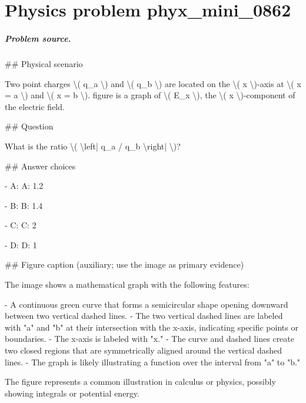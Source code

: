 
\chapter{Physics problem phyx\_mini\_0862}
\label{ch:PhyXMiniProblems_problem_phyx_mini_0862}

\paragraph{Problem source.}
\#\# Physical scenario

Two point charges \textbackslash{}( q\_a \textbackslash{}) and \textbackslash{}( q\_b \textbackslash{}) are located on the \textbackslash{}( x \textbackslash{})-axis at \textbackslash{}( x = a \textbackslash{}) and \textbackslash{}( x = b \textbackslash{}). figure is a graph of \textbackslash{}( E\_x \textbackslash{}), the \textbackslash{}( x \textbackslash{})-component of the electric field.

\#\# Question

What is the ratio \textbackslash{}( \textbackslash{}left| q\_a / q\_b \textbackslash{}right| \textbackslash{})?

\#\# Answer choices

- A: A: 1.2

- B: B: 1.4

- C: C: 2

- D: D: 1

\#\# Figure caption (auxiliary; use the image as primary evidence)

The image shows a mathematical graph with the following features:

- A continuous green curve that forms a semicircular shape opening downward between two vertical dashed lines.
- The two vertical dashed lines are labeled with "a" and "b" at their intersection with the x-axis, indicating specific points or boundaries.
- The x-axis is labeled with "x."
- The curve and dashed lines create two closed regions that are symmetrically aligned around the vertical dashed lines.
- The graph is likely illustrating a function over the interval from "a" to "b." 

The figure represents a common illustration in calculus or physics, possibly showing integrals or potential energy.

